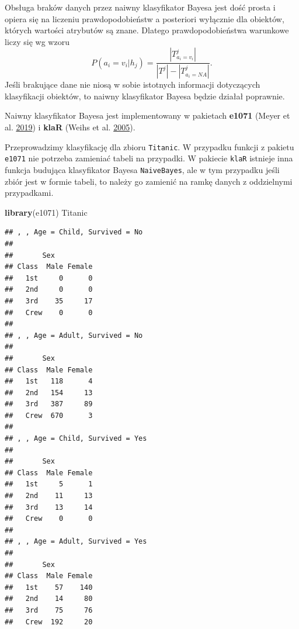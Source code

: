 \documentclass[
]{book}
\newenvironment{Shaded}{\begin{snugshade}}{\end{snugshade}}
\newcommand{\DataTypeTok}[1]{\textcolor[rgb]{0.13,0.29,0.53}{#1}}
\newcommand{\KeywordTok}[1]{\textcolor[rgb]{0.13,0.29,0.53}{\textbf{#1}}}
\newcommand{\NormalTok}[1]{#1}
\newcommand{\OperatorTok}[1]{\textcolor[rgb]{0.81,0.36,0.00}{\textbf{#1}}}
\newcommand{\StringTok}[1]{\textcolor[rgb]{0.31,0.60,0.02}{#1}}
\theoremstyle{plain}
\theoremstyle{definition}
\theoremstyle{definition}
\theoremstyle{definition}
\theoremstyle{definition}
\theoremstyle{remark}
\let\BeginKnitrBlock\begin \let\EndKnitrBlock\end
\begin{document}
Obsługa braków danych przez naiwny klasyfikator Bayesa jest dość prosta i opiera się na liczeniu prawdopodobieństw a posteriori wyłącznie dla obiektów, których wartości atrybutów są znane. Dlatego prawdopodobieństwa warunkowe liczy się wg wzoru
\begin{equation}\label{pr_war}
        P(a_i=v_i|h_j)=\frac{|T^j_{a_i=v_i}|}{|T^j|-|T^j_{a_i=NA}|}.
\end{equation}
Jeśli brakujące dane nie niosą w sobie istotnych informacji dotyczących klasyfikacji obiektów, to naiwny klasyfikator Bayesa będzie działał poprawnie.

Naiwny klasyfikator Bayesa jest implementowany w pakietach \textbf{e1071} (Meyer et al. \protect\hyperlink{ref-R-e1071}{2019}) i \textbf{klaR} (Weihs et al. \protect\hyperlink{ref-R-klaR}{2005}).

\BeginKnitrBlock{example}
\protect\hypertarget{exm:unnamed-chunk-74}{}{\label{exm:unnamed-chunk-74} }Przeprowadzimy klasyfikację dla zbioru \texttt{Titanic}. W przypadku funkcji z pakietu \texttt{e1071} nie potrzeba zamieniać tabeli na przypadki. W pakiecie \texttt{klaR} istnieje inna funkcja budująca klasyfikator Bayesa \texttt{NaiveBayes}, ale w tym przypadku jeśli zbiór jest w formie tabeli, to należy go zamienić na ramkę danych z oddzielnymi przypadkami.
\EndKnitrBlock{example}

\begin{Shaded}
\begin{Highlighting}[]
\KeywordTok{library}\NormalTok{(e1071)}
\NormalTok{Titanic}
\end{Highlighting}
\end{Shaded}

\begin{verbatim}
## , , Age = Child, Survived = No
## 
##       Sex
## Class  Male Female
##   1st     0      0
##   2nd     0      0
##   3rd    35     17
##   Crew    0      0
## 
## , , Age = Adult, Survived = No
## 
##       Sex
## Class  Male Female
##   1st   118      4
##   2nd   154     13
##   3rd   387     89
##   Crew  670      3
## 
## , , Age = Child, Survived = Yes
## 
##       Sex
## Class  Male Female
##   1st     5      1
##   2nd    11     13
##   3rd    13     14
##   Crew    0      0
## 
## , , Age = Adult, Survived = Yes
## 
##       Sex
## Class  Male Female
##   1st    57    140
##   2nd    14     80
##   3rd    75     76
##   Crew  192     20
\end{verbatim}

\begin{Shaded}
\end{Shaded}
\end{document}

